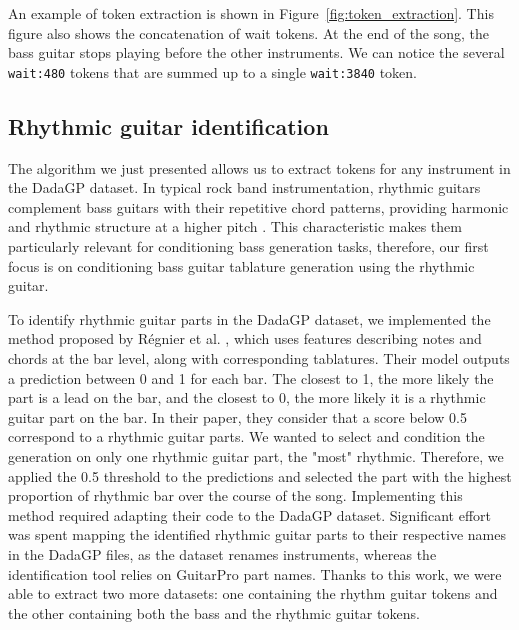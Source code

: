 An example of token extraction is shown in Figure~\ref{fig:token_extraction}.
This figure also shows the concatenation of wait tokens.
At the end of the song, the bass guitar stops playing before the other instruments.
We can notice the several \texttt{wait:480} tokens that are summed up to a single \texttt{wait:3840} token.

\subsection{Rhythmic guitar identification}

The algorithm we just presented allows us to extract tokens for any instrument in the DadaGP dataset.
In typical rock band instrumentation, rhythmic guitars complement bass guitars with their repetitive chord patterns, providing harmonic and rhythmic structure at a higher pitch \cite{regnier_identification_2021}.
This characteristic makes them particularly relevant for conditioning bass generation tasks, therefore, our first focus is on conditioning bass guitar tablature generation using the rhythmic guitar.


To identify rhythmic guitar parts in the DadaGP dataset, we implemented the method proposed by Régnier et al. \cite{regnier_identification_2021},
which uses features describing notes and chords at the bar level, along with corresponding tablatures.
Their model outputs a prediction between 0 and 1 for each bar. The closest to 1, the more likely the part is a lead on the bar, and the closest to 0, the more likely it is a rhythmic guitar part on the bar.
In their paper, they consider that a score below 0.5 correspond to a rhythmic guitar parts. We wanted to select and condition the generation on only one rhythmic guitar part, the "most" rhythmic.
Therefore, we applied the 0.5 threshold to the predictions and selected the part with the highest proportion of rhythmic bar over the course of the song.
Implementing this method required adapting their code to the DadaGP dataset.
Significant effort was spent mapping the identified rhythmic guitar parts to their respective names in the DadaGP files, as the dataset renames instruments, whereas the identification tool relies on GuitarPro part names.
Thanks to this work, we were able to extract two more datasets: one containing the rhythm guitar tokens and the other containing both the bass and the rhythmic guitar tokens.

